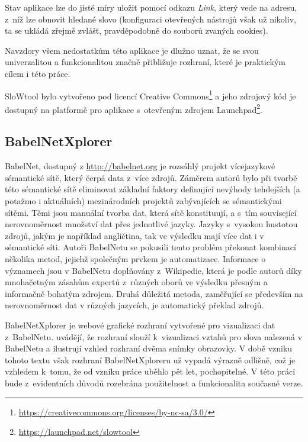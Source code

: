 \documentclass[a4paper, 11pt, oneside, showtrims]{book}
\begin{document}
					Stav aplikace lze do jisté míry uložit pomocí odkazu \textit{Link}, který vede na adresu, z~níž lze obnovit hledané slovo (konfiguraci otevřených nástrojů však už nikoliv, ta se ukládá zřejmě zvlášť, pravděpodobně do souborů zvaných cookies).

					Navzdory všem nedostatkům této aplikace je dlužno uznat, že se svou univerzalitou a funkcionalitou značně přibližuje rozhraní, které je praktickým cílem i této práce.

					SloWtool bylo vytvořeno pod licencí Creative Commons\footnote{\url{https://creativecommons.org/licenses/by-nc-sa/3.0/}} a jeho zdrojový kód je dostupný na platformě pro aplikace s~otevřeným zdrojem Launchpad\footnote{\url{https://launchpad.net/slowtool}}. \parencite{fivser2011visualizing}

				\subsection{BabelNetXplorer}
				\label{vis:babel}

					BabelNet, dostupný z \url{http://babelnet.org} je rozsáhlý projekt vícejazykové sémantické sítě, který čerpá data z~více zdrojů. Záměrem autorů bylo při tvorbě této sémantické sítě 
					eliminovat základní faktory definující nevýhody tehdejších (a potažmo i aktuálních) mezinárodních projektů zabývajících se sémantickými sítěmi. Těmi jsou manuální tvorba dat, která sítě konstituují, a s~tím související nerovnoměrnost množství dat přes jednotlivé jazyky. Jazyky s~vysokou hustotou zdrojů, jakým je například angličtina, tak ve výsledku mají více dat i v sémantické síti. Autoři BabelNetu se pokusili tento problém překonat kombinací několika metod, jejichž společným prvkem je automatizace. Informace o významech jsou v BabelNetu doplňovány z~Wikipedie, která je podle autorů díky mnohačetným zásahům expertů z~různých oborů ve výsledku přesným a informačně bohatým zdrojem. Druhá důležitá metoda, zaměřující se především na nerovnoměrnost dat v různých jazycích, je automatický překlad zdrojů. \parencite{navigli2010babelnet}

					BabelNetXplorer je webové grafické rozhraní vytvořené pro vizualizaci dat z~BabelNetu. \textcite{navigli2012babelnetxplorer} uvádějí, že rozhraní slouží k~vizualizaci vztahů pro slova nalezená v BabelNetu a ilustrují vzhled rozhraní dvěma snímky obrazovky. V době vzniku tohoto textu však rozhraní BabelNetXploreru už vypadá výrazně odlišně, což je vzhledem k~tomu, že od vzniku práce \textcite{navigli2012babelnetxplorer} uběhlo pět let, pochopitelné. V této práci bude z~evidentních důvodů rozebrána použitelnost a funkcionalita současné verze.
\end{document}
